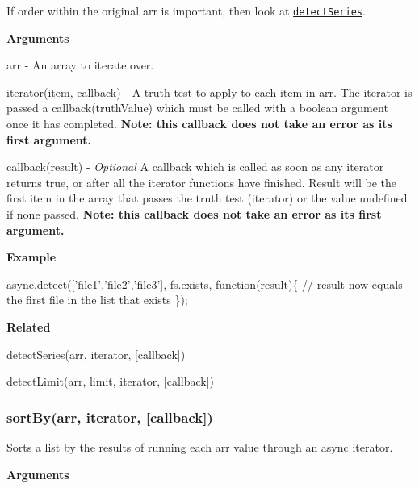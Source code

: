 If order within the original {\ttfamily arr} is important, then look at \href{#detectSeries}{\tt {\ttfamily detect\+Series}}.

{\bfseries Arguments}


\begin{DoxyItemize}
\item {\ttfamily arr} -\/ An array to iterate over.
\item {\ttfamily iterator(item, callback)} -\/ A truth test to apply to each item in {\ttfamily arr}. The iterator is passed a {\ttfamily callback(truth\+Value)} which must be called with a boolean argument once it has completed. {\bfseries Note\+: this callback does not take an error as its first argument.}
\item {\ttfamily callback(result)} -\/ {\itshape Optional} A callback which is called as soon as any iterator returns {\ttfamily true}, or after all the {\ttfamily iterator} functions have finished. Result will be the first item in the array that passes the truth test (iterator) or the value {\ttfamily undefined} if none passed. {\bfseries Note\+: this callback does not take an error as its first argument.}
\end{DoxyItemize}

{\bfseries Example}


\begin{DoxyCode}
async.detect(['file1','file2','file3'], fs.exists, function(result)\{
    // result now equals the first file in the list that exists
\});
\end{DoxyCode}


{\bfseries Related}


\begin{DoxyItemize}
\item detect\+Series(arr, iterator, \mbox{[}callback\mbox{]})
\item detect\+Limit(arr, limit, iterator, \mbox{[}callback\mbox{]}) 


\end{DoxyItemize}

\label{_sortBy}%
 \subsubsection*{sort\+By(arr, iterator, \mbox{[}callback\mbox{]})}

Sorts a list by the results of running each {\ttfamily arr} value through an async {\ttfamily iterator}.

{\bfseries Arguments}


